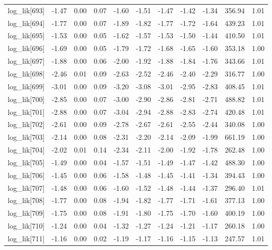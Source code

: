 \begin{table}[ht]
\begin{tabular}{rrrrrrrrrrr}
  log\_lik[693] & -1.47 & 0.00 & 0.07 & -1.60 & -1.51 & -1.47 & -1.42 & -1.34 & 356.94 & 1.01 \\ 
  log\_lik[694] & -1.77 & 0.00 & 0.07 & -1.89 & -1.82 & -1.77 & -1.72 & -1.64 & 439.23 & 1.01 \\ 
  log\_lik[695] & -1.53 & 0.00 & 0.05 & -1.62 & -1.57 & -1.53 & -1.50 & -1.44 & 410.50 & 1.01 \\ 
  log\_lik[696] & -1.69 & 0.00 & 0.05 & -1.79 & -1.72 & -1.68 & -1.65 & -1.60 & 353.18 & 1.00 \\ 
  log\_lik[697] & -1.88 & 0.00 & 0.06 & -2.00 & -1.92 & -1.88 & -1.84 & -1.76 & 343.66 & 1.01 \\ 
  log\_lik[698] & -2.46 & 0.01 & 0.09 & -2.63 & -2.52 & -2.46 & -2.40 & -2.29 & 316.77 & 1.00 \\ 
  log\_lik[699] & -3.01 & 0.00 & 0.09 & -3.20 & -3.08 & -3.01 & -2.95 & -2.83 & 408.45 & 1.01 \\ 
  log\_lik[700] & -2.85 & 0.00 & 0.07 & -3.00 & -2.90 & -2.86 & -2.81 & -2.71 & 488.82 & 1.01 \\ 
  log\_lik[701] & -2.88 & 0.00 & 0.07 & -3.04 & -2.94 & -2.88 & -2.83 & -2.74 & 420.48 & 1.01 \\ 
  log\_lik[702] & -2.61 & 0.00 & 0.09 & -2.78 & -2.67 & -2.61 & -2.55 & -2.44 & 340.08 & 1.00 \\ 
  log\_lik[703] & -2.14 & 0.00 & 0.08 & -2.31 & -2.20 & -2.14 & -2.09 & -1.99 & 661.19 & 1.00 \\ 
  log\_lik[704] & -2.02 & 0.01 & 0.14 & -2.34 & -2.11 & -2.00 & -1.92 & -1.78 & 262.48 & 1.00 \\ 
  log\_lik[705] & -1.49 & 0.00 & 0.04 & -1.57 & -1.51 & -1.49 & -1.47 & -1.42 & 488.30 & 1.00 \\ 
  log\_lik[706] & -1.45 & 0.00 & 0.06 & -1.58 & -1.48 & -1.45 & -1.41 & -1.34 & 394.43 & 1.00 \\ 
  log\_lik[707] & -1.48 & 0.00 & 0.06 & -1.60 & -1.52 & -1.48 & -1.44 & -1.37 & 296.40 & 1.01 \\ 
  log\_lik[708] & -1.77 & 0.00 & 0.08 & -1.94 & -1.82 & -1.77 & -1.71 & -1.61 & 377.13 & 1.00 \\ 
  log\_lik[709] & -1.75 & 0.00 & 0.08 & -1.91 & -1.80 & -1.75 & -1.70 & -1.60 & 400.19 & 1.00 \\ 
  log\_lik[710] & -1.24 & 0.00 & 0.04 & -1.32 & -1.27 & -1.24 & -1.21 & -1.17 & 260.18 & 1.00 \\ 
  log\_lik[711] & -1.16 & 0.00 & 0.02 & -1.19 & -1.17 & -1.16 & -1.15 & -1.13 & 247.57 & 1.01 \\ 

\end{tabular}
\end{table}
